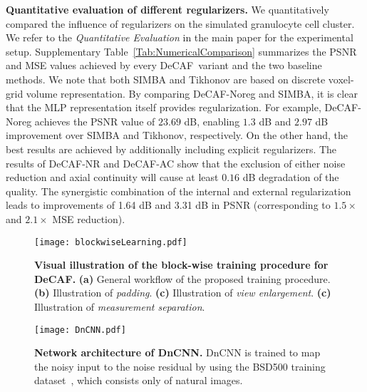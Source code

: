 \documentclass[11pt]{article}
\theoremstyle{plain} %
\def\proposed{DeCAF}
\begin{document}
\vspace{0.5em}
\noindent
\textbf{Quantitative evaluation of different regularizers.} We quantitatively compared the influence of regularizers on the simulated granulocyte cell cluster. 
We refer to the \emph{Quantitative Evaluation} in the main paper for the experimental setup. 
Supplementary Table~\ref{Tab:NumericalComparison} summarizes the  PSNR and MSE values achieved by every \proposed~variant and the two baseline methods.
We note that both SIMBA and Tikhonov are based on discrete voxel-grid volume representation.   
By comparing \proposed-Noreg and SIMBA, it is clear that the MLP representation itself provides regularization. For example, \proposed-Noreg achieves the PSNR value of $23.69$ dB, enabling $1.3$ dB and $2.97$ dB improvement over SIMBA and Tikhonov, respectively. 
On the other hand, the best results are achieved by additionally including explicit regularizers. The results of \proposed-NR and \proposed-AC show that the exclusion of either noise reduction and axial continuity will cause at least $0.16$ dB degradation of the quality. The synergistic combination of the internal and external regularization leads to improvements of 1.64 dB and 3.31 dB in PSNR (corresponding to $1.5\times$ and $2.1\times$ MSE reduction).

\newpage
\setcounter{figure}{0}
\renewcommand{\figurename}{Supplementary Figure}
\renewcommand{\tablename}{Supplementary Table}

\begin{figure}[t!]
\begin{center}
\texttt{[image: blockwiseLearning.pdf]}
\end{center}
\caption{
\textbf{Visual illustration of the block-wise training procedure for \proposed.}
\textbf{(a)} General workflow of the proposed training procedure.
\textbf{(b)} Illustration of \emph{padding}.
\textbf{(c)} Illustration of \emph{view enlargement}.
\textbf{(c)} Illustration of \emph{measurement separation}.
}
\label{Fig:training}
\end{figure}
\clearpage

\begin{figure}[t!]
\begin{center}
\texttt{[image: DnCNN.pdf]}
\end{center}
\caption{
\textbf{Network architecture of DnCNN.} DnCNN is trained to map the noisy input to the noise residual by using the BSD500 training dataset~\cite{Martin.etal2001}, which consists only of natural images. 
}
\label{Fig:dncnn}
\end{figure}
\clearpage
\end{document}
